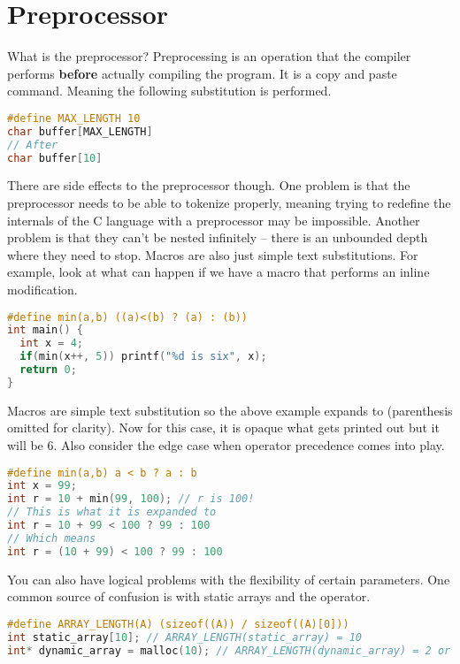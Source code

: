 \section{Preprocessor}

What is the preprocessor? Preprocessing is an operation that the compiler performs \textbf{before} actually compiling the program.
It is a copy and paste command.
Meaning the following substitution is performed.

\begin{lstlisting}[language=C]
#define MAX_LENGTH 10
char buffer[MAX_LENGTH]
// After
char buffer[10]
\end{lstlisting}

There are side effects to the preprocessor though.
One problem is that the preprocessor needs to be able to tokenize properly, meaning trying to redefine the internals of the C language with a preprocessor may be impossible.
Another problem is that they can't be nested infinitely -- there is an unbounded depth where they need to stop.
Macros are also just simple text substitutions.
For example, look at what can happen if we have a macro that performs an inline modification.

\begin{lstlisting}[language=C]
#define min(a,b) ((a)<(b) ? (a) : (b))
int main() {
  int x = 4;
  if(min(x++, 5)) printf("%d is six", x);
  return 0;
}
\end{lstlisting}

Macros are simple text substitution so the above example expands to  (parenthesis omitted for clarity).
Now for this case, it is opaque what gets printed out but it will be 6.
Also consider the edge case when operator precedence comes into play.

\begin{lstlisting}[language=C]
#define min(a,b) a < b ? a : b
int x = 99;
int r = 10 + min(99, 100); // r is 100!
// This is what it is expanded to
int r = 10 + 99 < 100 ? 99 : 100
// Which means
int r = (10 + 99) < 100 ? 99 : 100
\end{lstlisting}

You can also have logical problems with the flexibility of certain parameters.
One common source of confusion is with static arrays and the  operator.

\begin{lstlisting}[language=C]
#define ARRAY_LENGTH(A) (sizeof((A)) / sizeof((A)[0]))
int static_array[10]; // ARRAY_LENGTH(static_array) = 10
int* dynamic_array = malloc(10); // ARRAY_LENGTH(dynamic_array) = 2 or 1
\end{lstlisting}

